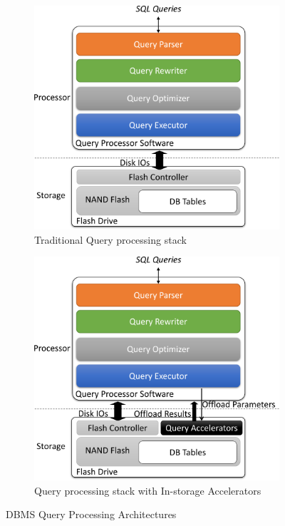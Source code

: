 \documentclass{article}
\begin{document}
\begin{figure}[!htb]
  \centering
    \begin{subfigure}[t]{0.40\textwidth}
      \includegraphics[width=\textwidth]{figures/software-stack-crop.pdf}
      \caption{Traditional Query processing stack}
      \label{fig:software}
  \end{subfigure}\hspace{5pt}
  \begin{subfigure}[t]{0.40\textwidth}
    \includegraphics[width=\textwidth]{figures/accelerator-stack-crop.pdf}
    \caption{Query processing stack with In-storage Accelerators}
    \label{fig:accelerator}
  \end{subfigure}
  \label{fig:try}
  \caption{DBMS Query Processing Architectures}
\end{figure}
\end{document}
